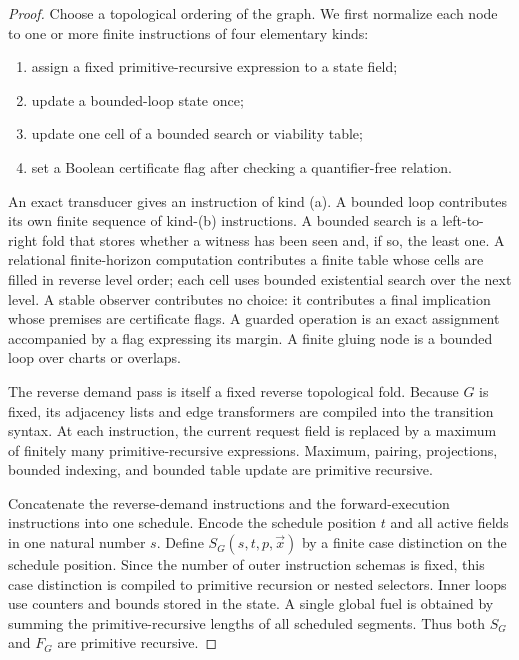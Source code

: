 \begin{proof}
Choose a topological ordering of the graph.  We first normalize each node to one or more finite instructions of four elementary kinds:

\begin{enumerate}[label=(\alph*)]
\item assign a fixed primitive-recursive expression to a state field;
\item update a bounded-loop state once;
\item update one cell of a bounded search or viability table;
\item set a Boolean certificate flag after checking a quantifier-free relation.
\end{enumerate}

An exact transducer gives an instruction of kind (a).  A bounded loop contributes its own finite sequence of kind-(b) instructions.  A bounded search is a left-to-right fold that stores whether a witness has been seen and, if so, the least one.  A relational finite-horizon computation contributes a finite table whose cells are filled in reverse level order; each cell uses bounded existential search over the next level.  A stable observer contributes no choice: it contributes a final implication whose premises are certificate flags.  A guarded operation is an exact assignment accompanied by a flag expressing its margin.  A finite gluing node is a bounded loop over charts or overlaps.

The reverse demand pass is itself a fixed reverse topological fold.  Because \(G\) is fixed, its adjacency lists and edge transformers are compiled into the transition syntax.  At each instruction, the current request field is replaced by a maximum of finitely many primitive-recursive expressions.  Maximum, pairing, projections, bounded indexing, and bounded table update are primitive recursive.

Concatenate the reverse-demand instructions and the forward-execution instructions into one schedule.  Encode the schedule position \(t\) and all active fields in one natural number \(s\).  Define \(S_G(s,t,p,\vec{x})\) by a finite case distinction on the schedule position.  Since the number of outer instruction schemas is fixed, this case distinction is compiled to primitive recursion or nested selectors.  Inner loops use counters and bounds stored in the state.  A single global fuel is obtained by summing the primitive-recursive lengths of all scheduled segments.  Thus both \(S_G\) and \(F_G\) are primitive recursive.


\end{proof}
